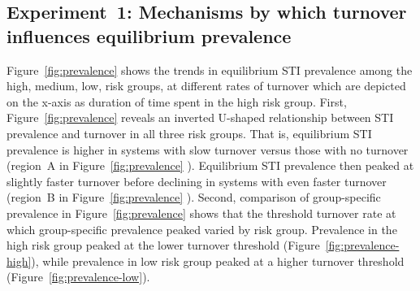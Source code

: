 \subsection{Experiment~1: Mechanisms by which turnover influences equilibrium prevalence}
\label{ss:res-prevalence}
Figure~\ref{fig:prevalence} shows the trends in equilibrium STI prevalence  			
among the high, medium, low, risk groups, at different rates of turnover which 		%
are depicted on the x-axis as
duration of time spent in the high risk group.
First, Figure~\ref{fig:prevalence} reveals an inverted U-shaped relationship
between STI prevalence and turnover in all three risk groups.
That is, equilibrium STI prevalence is higher in systems with slow turnover 
versus those with no turnover 
(region~A in Figure~\ref{fig:prevalence} ). Equilibrium STI prevalence then peaked						%
at slightly faster turnover before declining in systems with even faster turnover 
(region~B in Figure~\ref{fig:prevalence} ).
Second, comparison of group-specific prevalence in Figure~\ref{fig:prevalence} shows that
the threshold turnover rate at which group-specific prevalence peaked
varied by risk group.
Prevalence in the high risk group peaked at the lower turnover threshold
(Figure~\ref{fig:prevalence-high}),
while prevalence in low risk group peaked at a higher turnover threshold								
(Figure~\ref{fig:prevalence-low}).


